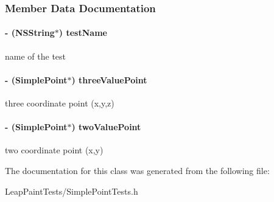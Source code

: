 \subsubsection{Member Data Documentation}
\hypertarget{interface_simple_point_tests_a649cb8fc74d522648b3d242a79d67c52}{
\paragraph[{test\-Name}]{\setlength{\rightskip}{0pt plus 5cm}-\/ (N\-S\-String$\ast$) test\-Name\hspace{0.3cm}{\ttfamily [protected]}}}\label{df/dbc/interface_simple_point_tests_a649cb8fc74d522648b3d242a79d67c52}
name of the test \hypertarget{interface_simple_point_tests_a3eaccf68ce0b22a31daba1edb2e70762}{
\paragraph[{three\-Value\-Point}]{\setlength{\rightskip}{0pt plus 5cm}-\/ ({\bf Simple\-Point}$\ast$) three\-Value\-Point\hspace{0.3cm}{\ttfamily [protected]}}}\label{df/dbc/interface_simple_point_tests_a3eaccf68ce0b22a31daba1edb2e70762}
three coordinate point (x,y,z) \hypertarget{interface_simple_point_tests_a7de54d867fc86e46d98627fd689508f6}{
\paragraph[{two\-Value\-Point}]{\setlength{\rightskip}{0pt plus 5cm}-\/ ({\bf Simple\-Point}$\ast$) two\-Value\-Point\hspace{0.3cm}{\ttfamily [protected]}}}\label{df/dbc/interface_simple_point_tests_a7de54d867fc86e46d98627fd689508f6}
two coordinate point (x,y) 

The documentation for this class was generated from the following file\-:\begin{DoxyCompactItemize}
\item 
Leap\-Paint\-Tests/Simple\-Point\-Tests.\-h\end{DoxyCompactItemize}
